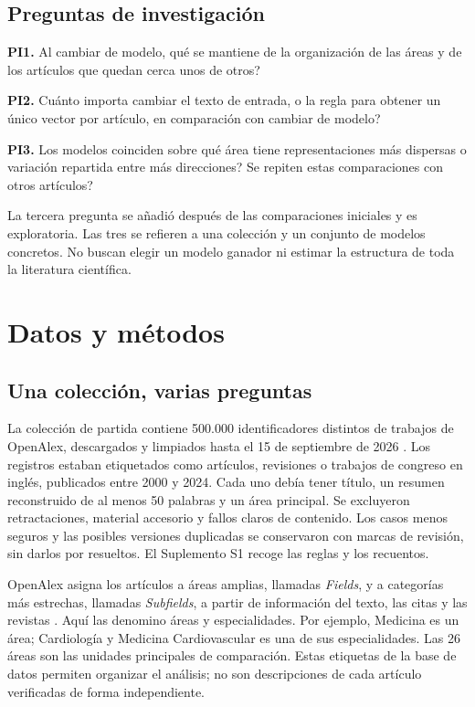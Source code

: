 \documentclass[12pt]{article}
\begin{document}
\subsection{Preguntas de investigación}
\textbf{PI1.} Al cambiar de modelo, \textquestiondown{}qué se mantiene de la organización de las áreas y de los artículos que quedan cerca unos de otros?

\textbf{PI2.} \textquestiondown{}Cuánto importa cambiar el texto de entrada, o la regla para obtener un único vector por artículo, en comparación con cambiar de modelo?

\textbf{PI3.} \textquestiondown{}Los modelos coinciden sobre qué área tiene representaciones más dispersas o variación repartida entre más direcciones? \textquestiondown{}Se repiten estas comparaciones con otros artículos?

La tercera pregunta se añadió después de las comparaciones iniciales y es exploratoria. Las tres se refieren a una colección y un conjunto de modelos concretos. No buscan elegir un modelo ganador ni estimar la estructura de toda la literatura científica.

\clearpage
\section{Datos y métodos}
\subsection{Una colección, varias preguntas}
La colección de partida contiene 500.000 identificadores distintos de trabajos de OpenAlex, descargados y limpiados hasta el 15 de septiembre de 2026 \citep{priem2022openalex}. Los registros estaban etiquetados como artículos, revisiones o trabajos de congreso en inglés, publicados entre 2000 y 2024. Cada uno debía tener título, un resumen reconstruido de al menos 50 palabras y un área principal. Se excluyeron retractaciones, material accesorio y fallos claros de contenido. Los casos menos seguros y las posibles versiones duplicadas se conservaron con marcas de revisión, sin darlos por resueltos. El Suplemento S1 recoge las reglas y los recuentos.

OpenAlex asigna los artículos a áreas amplias, llamadas \emph{Fields}, y a categorías más estrechas, llamadas \emph{Subfields}, a partir de información del texto, las citas y las revistas \citep{openalex2026topics}. Aquí las denomino áreas y especialidades. Por ejemplo, Medicina es un área; Cardiología y Medicina Cardiovascular es una de sus especialidades. Las 26 áreas son las unidades principales de comparación. Estas etiquetas de la base de datos permiten organizar el análisis; no son descripciones de cada artículo verificadas de forma independiente.
\end{document}
